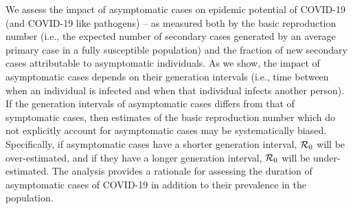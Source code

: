 {\footnotesize We assess the impact of asymptomatic cases on epidemic potential of COVID-19 (and COVID-19 like pathogens) -- as measured both by the basic reproduction 
number (i.e., the expected number of secondary cases generated by an average primary case in a fully susceptible population) and the fraction of new secondary cases attributable to asymptomatic
individuals. As we show, the impact of asymptomatic
cases depends on their generation intervals (i.e., time between when an individual is infected and when that individual infects another person).
If the generation intervals of asymptomatic cases differs from that 
of symptomatic cases, then estimates of the basic reproduction number which do not explicitly account for asymptomatic cases may be systematically biased. Specifically, if asymptomatic cases have a shorter generation interval, 
${\cal{R}}_0$ will be over-estimated, and if they have a longer generation interval, ${\cal{R}}_0$ will be under-estimated.
The analysis provides a rationale for assessing the duration of asymptomatic cases 
of COVID-19 in addition to their prevalence in the population.
}
